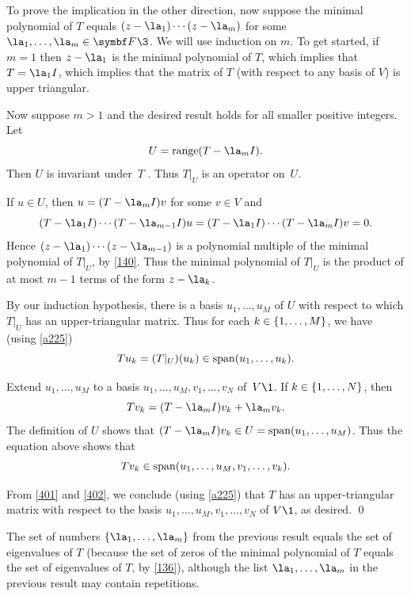To prove the implication in the other direction, now suppose the minimal polynomial of $T$ equals
$(z-\la_1) \cdots (z-\la_m)$ for some $\la_1, \ldots, \la_m \in \F{}\3$. We will use induction on $m$. To get started, if $m = 1$ then $z-\la_1$ is the minimal polynomial of $T$, which implies that $T = \la_1 I$, which implies that the matrix of $T$ (with respect to any basis of $V$) is upper triangular.

Now suppose $m > 1$ and the desired result holds for all smaller positive integers. Let
\[
U = \ran (T - \la_m I).
\]
Then $U$ is invariant under~$T$ .
Thus $T|_U$ is an operator on~$U$.

If $u \in U$, then $u = (T - \la_m I) v$ for some $v \in V$ and
\[
(T - \la_1 I) \cdots (T - \la_{m-1} I) u = (T - \la_1 I) \cdots (T - \la_m I) v = 0.
\]
Hence $(z - \la_1) \cdots (z-\la_{m-1})$ is a polynomial multiple of the minimal polynomial of $T|_U$, by \ref{140}. Thus the minimal polynomial of $T|_U$ is the product of at most $m-1$ terms of the form $z-\la_k$.

By our induction hypothesis, there is a basis
$u_1, \dots, u_M$ of $U$ with respect to which $T|_U$ has an upper-triangular
matrix.  Thus for each $k \in \{1, \ldots, M\}$, we have (using \ref {a225})
\begin{equation} \label{401}
Tu_k = (T|_U)(u_k) \in \operatorname{span}(u_1, \dots, u_k).
\end{equation}%

Extend $u_1, \dots, u_M$ to a basis $u_1, \dots, u_M, v_1, \dots, v_N$ of~$V\1$.
If $k \in \{1, \ldots, N\}$, then
\[
Tv_k = (T - \la_m I)v_k + \la_m v_k.
\]
The definition of $U$ shows that $(T - \la_m I)v_k \in U = \Span(u_1, \dots, u_M)$.
Thus the equation above shows that
\begin{equation} \label{402}
Tv_k \in \operatorname{span}(u_1, \dots, u_M, v_1, \dots, v_k).
\end{equation}%

From \ref{401} and \ref{402}, we conclude (using \ref {a225}) that $T$ has
an upper-triangular matrix with respect to the basis $u_1, \dots, u_M, v_1, \dots, v_N$ of $V\1$, as desired.
\qed

The set of numbers $\br{\la_1, \ldots, \la_m}$ from the previous result equals the set of eigenvalues of $T$ (because the set of zeros of the minimal polynomial of $T$ equals the set of eigenvalues of $T$, by \ref{136}), although the list $\la_1, \ldots, \la_m$ in the previous result may contain repetitions.

